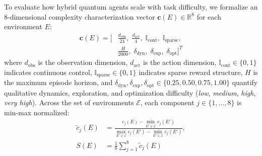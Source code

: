 \documentclass[conference]{IEEEtran}
\begin{document}
To evaluate how hybrid quantum agents scale with task difficulty, we formalize an 8-dimensional complexity characterization vector $\mathbf{c}(E) \in \mathbb{R}^8$ for each environment $E$:
\begin{equation}
\begin{aligned}
\mathbf{c}(E) = \Big[ &\frac{d_{\text{obs}}}{24},\; \frac{d_{\text{act}}}{4},\; \mathbb{I}_{\text{cont}},\; \mathbb{I}_{\text{sparse}}, \\
&\frac{H}{2000},\; \delta_{\text{dyn}},\; \delta_{\text{exp}},\; \delta_{\text{opt}} \Big]^T
\end{aligned}
\label{eq:complexity_vec}
\end{equation}
where $d_{\text{obs}}$ is the observation dimension, $d_{\text{act}}$ is the action dimension, $\mathbb{I}_{\text{cont}} \in \{0,1\}$ indicates continuous control, $\mathbb{I}_{\text{sparse}} \in \{0,1\}$ indicates sparse reward structure, $H$ is the maximum episode horizon, and $\delta_{\text{dyn}}, \delta_{\text{exp}}, \delta_{\text{opt}} \in \{0.25, 0.50, 0.75, 1.00\}$ quantify qualitative dynamics, exploration, and optimization difficulty (\textit{low}, \textit{medium}, \textit{high}, \textit{very high}). Across the set of environments $\mathcal{E}$, each component $j \in \{1, \dots, 8\}$ is min-max normalized:
\begin{equation}
\begin{aligned}
\tilde{c}_j(E) &= \frac{c_j(E) - \min_{E' \in \mathcal{E}} c_j(E')}{\max_{E' \in \mathcal{E}} c_j(E') - \min_{E' \in \mathcal{E}} c_j(E')}, \\
S(E) &= \frac{1}{8}\sum_{j=1}^8 \tilde{c}_j(E)
\end{aligned}
\end{equation}
\end{document}
